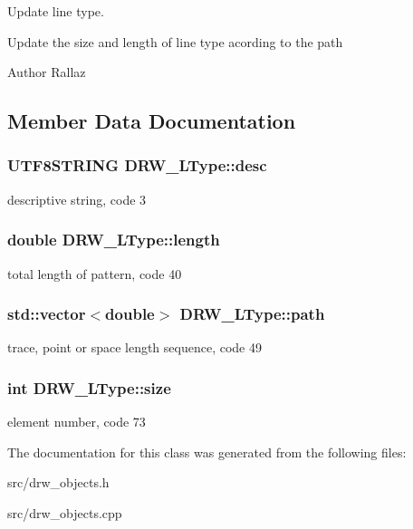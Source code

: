 Update line type. 

Update the size and length of line type acording to the path \begin{DoxyAuthor}{Author}
Rallaz 
\end{DoxyAuthor}


\subsection{Member Data Documentation}
\hypertarget{class_d_r_w___l_type_ae6f6458c8c9ac100908259558c7e22d2}{}
\subsubsection[{desc}]{\setlength{\rightskip}{0pt plus 5cm}U\+T\+F8\+S\+T\+R\+I\+N\+G D\+R\+W\+\_\+\+L\+Type\+::desc}\label{class_d_r_w___l_type_ae6f6458c8c9ac100908259558c7e22d2}
descriptive string, code 3 \hypertarget{class_d_r_w___l_type_a438510524566f0deaf77ea694f171762}{}
\subsubsection[{length}]{\setlength{\rightskip}{0pt plus 5cm}double D\+R\+W\+\_\+\+L\+Type\+::length}\label{class_d_r_w___l_type_a438510524566f0deaf77ea694f171762}
total length of pattern, code 40 \hypertarget{class_d_r_w___l_type_afb0702d3edab2948fdba2fb861fd3a4b}{}
\subsubsection[{path}]{\setlength{\rightskip}{0pt plus 5cm}std\+::vector$<$double$>$ D\+R\+W\+\_\+\+L\+Type\+::path}\label{class_d_r_w___l_type_afb0702d3edab2948fdba2fb861fd3a4b}
trace, point or space length sequence, code 49 \hypertarget{class_d_r_w___l_type_acb78cd0a105ac8b44e19313a4bf90f50}{}
\subsubsection[{size}]{\setlength{\rightskip}{0pt plus 5cm}int D\+R\+W\+\_\+\+L\+Type\+::size}\label{class_d_r_w___l_type_acb78cd0a105ac8b44e19313a4bf90f50}
element number, code 73 

The documentation for this class was generated from the following files\+:\begin{DoxyCompactItemize}
\item 
src/drw\+\_\+objects.\+h\item 
src/drw\+\_\+objects.\+cpp\end{DoxyCompactItemize}
